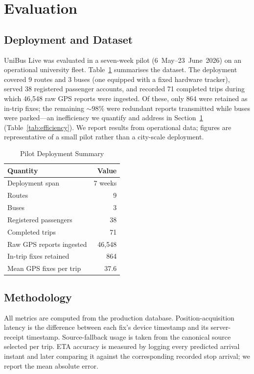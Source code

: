 \documentclass[conference]{IEEEtran}
\begin{document}
\section{Evaluation}
\label{sec:evaluation}

\subsection{Deployment and Dataset}
UniBus Live was evaluated in a seven-week pilot (6~May--23~June~2026) on an
operational university fleet. Table~\ref{tab:dataset} summarises the dataset.
The deployment covered 9 routes and 3 buses (one equipped with a fixed
hardware tracker), served 38 registered passenger accounts, and recorded 71
completed trips during which 46{,}548 raw GPS reports were ingested. Of these,
only 864 were retained as in-trip fixes; the remaining ${\sim}98\%$ were
redundant reports transmitted while buses were parked---an inefficiency we
quantify and address in Section~\ref{sec:evaluation} (Table~\ref{tab:efficiency}).
We report results from operational data; figures are representative of a small
pilot rather than a city-scale deployment.

\begin{table}[H]
\caption{Pilot Deployment Summary}
\label{tab:dataset}
\centering
\begin{tabular}{lr}
\toprule
\textbf{Quantity} & \textbf{Value} \\
\midrule
Deployment span            & 7 weeks \\
Routes                     & 9 \\
Buses                      & 3 \\
Registered passengers      & 38 \\
Completed trips            & 71 \\
Raw GPS reports ingested   & 46{,}548 \\
In-trip fixes retained     & 864 \\
Mean GPS fixes per trip    & 37.6 \\
\bottomrule
\end{tabular}
\end{table}

\subsection{Methodology}
All metrics are computed from the production database. Position-acquisition
latency is the difference between each fix's device timestamp and its
server-receipt timestamp. Source-fallback usage is taken from the canonical
source selected per trip. ETA accuracy is measured by logging every predicted
arrival instant and later comparing it against the corresponding recorded stop
arrival; we report the mean absolute error.
\end{document}
